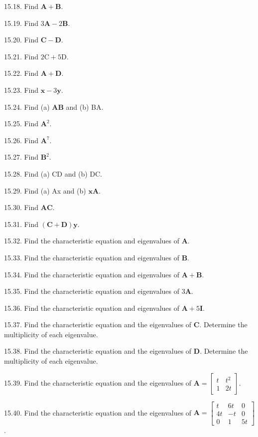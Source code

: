 \documentclass[10pt]{article}
\begin{document}
15.18. Find $\mathbf{A}+\mathbf{B}$.

15.19. Find $3 \mathbf{A}-2 \mathbf{B}$.

15.20. Find $\mathbf{C}-\mathbf{D}$.

15.21. Find $2 \mathrm{C}+5 \mathrm{D}$.

15.22. Find $\mathbf{A}+\mathbf{D}$.

15.23. Find $\mathbf{x}-3 \mathbf{y}$.

15.24. Find (a) $\mathbf{A B}$ and (b) BA.

15.25. Find $\mathbf{A}^{2}$.

15.26. Find $\mathbf{A}^{7}$.

15.27. Find $\mathbf{B}^{2}$.

15.28. Find (a) CD and (b) DC.

15.29. Find (a) Ax and (b) $\mathbf{x A}$.

15.30. Find $\mathbf{A C}$.

15.31. Find $(\mathbf{C}+\mathbf{D}) \mathbf{y}$.

15.32. Find the characteristic equation and eigenvalues of $\mathbf{A}$.

15.33. Find the characteristic equation and eigenvalues of $\mathbf{B}$.

15.34. Find the characteristic equation and eigenvalues of $\mathbf{A}+\mathbf{B}$.

15.35. Find the characteristic equation and eigenvalues of $3 \mathbf{A}$.

15.36. Find the characteristic equation and eigenvalues of $\mathbf{A}+5 \mathbf{I}$.

15.37. Find the characteristic equation and the eigenvalues of $\mathbf{C}$. Determine the multiplicity of each eigenvalue.

15.38. Find the characteristic equation and the eigenvalues of $\mathbf{D}$. Determine the multiplicity of each eigenvalue.

15.39. Find the characteristic equation and the eigenvalues of $\mathbf{A}=\left[\begin{array}{ll}t & t^{2} \\ 1 & 2 t\end{array}\right]$.

15.40. Find the characteristic equation and the eigenvalues of $\mathbf{A}=\left[\begin{array}{ccc}t & 6 t & 0 \\ 4 t & -t & 0 \\ 0 & 1 & 5 t\end{array}\right]$.
\end{document}

